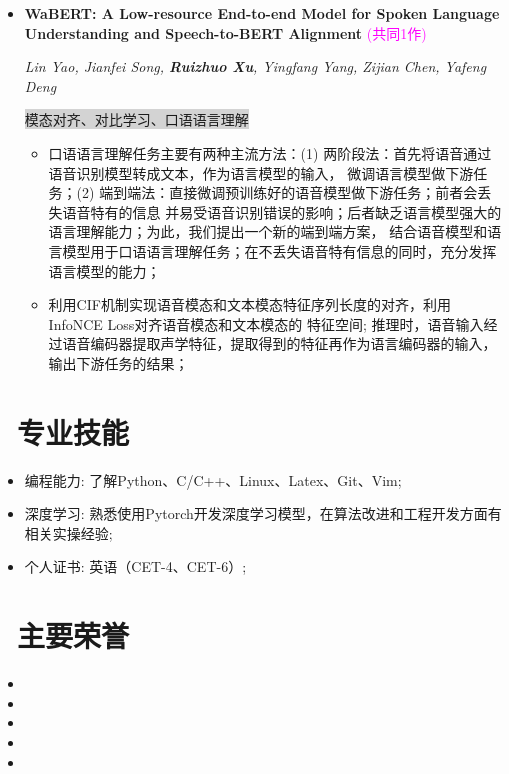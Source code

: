 \documentclass{resume}
\begin{document}
\begin{itemize}[parsep=0.5ex]
  \item \textbf{WaBERT: A Low-resource End-to-end Model for Spoken Language Understanding and Speech-to-BERT Alignment}
        \textcolor{magenta}{(共同1作)}
        \href{https://arxiv.org/abs/2204.10461}{\textcolor{linkcolor}{\faExternalLink{}}}

        \textit{Lin Yao, Jianfei Song, \textbf{Ruizhuo Xu}, Yingfang Yang, Zijian Chen, Yafeng Deng}

        \colorbox{lightgray}{模态对齐、对比学习、口语语言理解}

        \begin{itemize}[parsep=0.5ex]
          \item 口语语言理解任务主要有两种主流方法：(1) 两阶段法：首先将语音通过语音识别模型转成文本，作为语言模型的输入，
                微调语言模型做下游任务；(2) 端到端法：直接微调预训练好的语音模型做下游任务；前者会丢失语音特有的信息
                并易受语音识别错误的影响；后者缺乏语言模型强大的语言理解能力；为此，我们提出一个新的端到端方案，
                结合语音模型和语言模型用于口语语言理解任务；在不丢失语音特有信息的同时，充分发挥语言模型的能力；
          \item 利用CIF机制实现语音模态和文本模态特征序列长度的对齐，利用InfoNCE Loss对齐语音模态和文本模态的
                特征空间; 推理时，语音输入经过语音编码器提取声学特征，提取得到的特征再作为语言编码器的输入，
                输出下游任务的结果；
        \end{itemize}
        
\end{itemize}

\section{\faCogs\ 专业技能}
\begin{itemize}[parsep=0.5ex]
  \item 编程能力: 了解Python、C/C++、Linux、Latex、Git、Vim;
  \item 深度学习: 熟悉使用Pytorch开发深度学习模型，在算法改进和工程开发方面有相关实操经验;
  \item 个人证书: 英语（CET-4、CET-6）;
\end{itemize}

\section{\faHeartO\ 主要荣誉}
\begin{itemize}[parsep=0.5ex]
  \item {}
  \item {}
  \item {}
  \item {}
  \item {}
\end{itemize}


%
%
\end{document}
